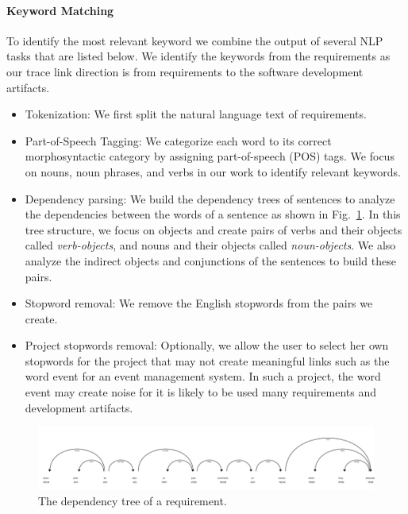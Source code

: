       \paragraph{Keyword Matching} To identify the most relevant keyword we combine the output of several NLP tasks that are listed below. We identify the keywords from the requirements as our trace link direction is from requirements to the software development artifacts.
      \begin{itemize}
      \item Tokenization: We first split the natural language text of requirements.
      \item Part-of-Speech Tagging: We categorize each word to its correct morphosyntactic category by assigning part-of-speech (POS) tags. We focus on nouns, noun phrases, and verbs in our work to identify relevant keywords.

      \item Dependency parsing: We build the dependency trees of sentences to analyze the dependencies between the words of a sentence as shown in Fig.~\ref{fig:deptree}. In this tree structure, we focus on objects and create pairs of verbs and their objects called \emph{verb-objects}, and nouns and their objects called \emph{noun-objects}. We also analyze the indirect objects and conjunctions of the sentences to build these pairs.


      \item Stopword removal: We remove the English stopwords from the pairs we create.


      \item Project stopwords removal: Optionally, we allow the user to select her own stopwords for the project that may not create meaningful links such as the word event for an event management system. In such a project, the word event may create noise for it is likely to be used many requirements and development artifacts.
      \end{itemize}


\begin{figure}[htbp]
    \centering
    \includegraphics[width=1\linewidth]{figs/displacy.png}
    \caption{The dependency tree of a requirement.}
    \label{fig:deptree}
  \end{figure}


